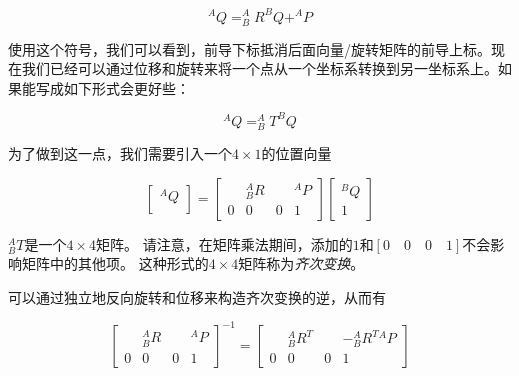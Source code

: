 \begin{equation}
^AQ=^A_BR^BQ+^AP
\end{equation}

使用这个符号，我们可以看到，前导下标抵消后面向量/旋转矩阵的前导上标。现在我们已经可以通过位移和旋转来将一个点从一个坐标系转换到另一坐标系上。如果能写成如下形式会更好些：

\begin{equation}
^AQ=^A_BT^BQ
\end{equation}

为了做到这一点，我们需要引入一个$4\times1$的位置向量

\begin{equation}
\left[\begin{array}{c}^AQ\\\end{array}\right]=\left[\begin{array}{ccc|c} & ^A_BR & & ^AP \\\hline 0 & 0 & 0 & 1\end{array}\right]\left[\begin{array}{c}^BQ\\1\end{array}\right]
\end{equation}

$^A_BT$是一个$4\times 4$矩阵。 请注意，在矩阵乘法期间，添加的$1$和$[0\quad 0\quad 0\quad 1]$不会影响矩阵中的其他项。 这种形式的$4\times 4$矩阵称为\emph{齐次变换}。


可以通过独立地反向旋转和位移来构造齐次变换的逆，从而有

\begin{equation}
\left[\begin{array}{ccc|c} & ^A_BR & & ^AP \\\hline 0 & 0 & 0 & 1\end{array}\right]^{-1}=
\left[\begin{array}{ccc|c} & ^A_BR^T & & -^A_B{R^T}{^AP} \\\hline 0 & 0 & 0 & 1\end{array}\right]
\end{equation}

